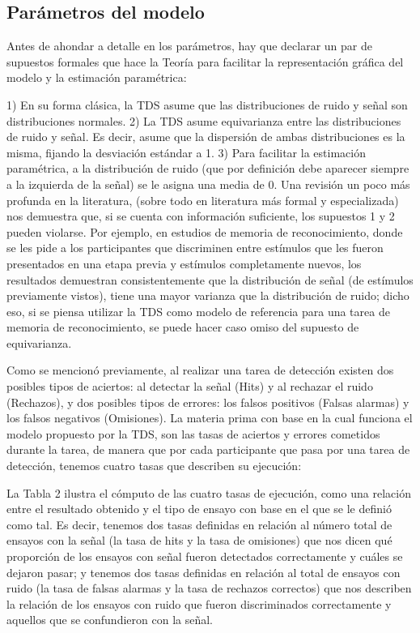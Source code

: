 \subsection{Parámetros del modelo}

Antes de ahondar a detalle en los parámetros, hay que declarar un par de supuestos formales que hace la Teoría para facilitar la representación gráfica del modelo y la estimación paramétrica:

1)	En su forma clásica, la TDS asume que las distribuciones de ruido y señal son distribuciones normales.
2)	La TDS asume equivarianza entre las distribuciones de ruido y señal. Es decir, asume que la dispersión de ambas distribuciones es la misma, fijando la desviación estándar a 1.
3)	Para facilitar la estimación paramétrica, a la distribución de ruido (que por definición debe aparecer siempre a la izquierda de la señal) se le asigna una media de 0.
Una revisión un poco más profunda en la literatura, (sobre todo en literatura más formal y especializada) nos demuestra que, si se cuenta con información suficiente, los supuestos 1 y 2 pueden violarse. Por ejemplo, en estudios de memoria de reconocimiento, donde se les pide a los participantes que discriminen entre estímulos que les fueron presentados en una etapa previa y estímulos completamente nuevos,  los resultados demuestran consistentemente que la distribución de señal (de estímulos previamente vistos), tiene una mayor varianza que la distribución de ruido; dicho eso, si se piensa utilizar la TDS como modelo de referencia para una tarea de memoria de reconocimiento, se puede hacer caso omiso del supuesto de equivarianza.  


Como se mencionó previamente, al realizar una tarea de detección existen dos posibles tipos de aciertos: al detectar la señal (Hits) y al rechazar el ruido (Rechazos), y dos posibles tipos de errores: los falsos positivos (Falsas alarmas) y los falsos negativos (Omisiones). La materia prima con base en la cual funciona el modelo propuesto por la TDS, son las tasas de aciertos y errores cometidos durante la tarea, de manera que por cada participante que pasa por una tarea de detección, tenemos cuatro tasas que describen su ejecución:

La Tabla 2 ilustra el cómputo de las cuatro tasas de ejecución, como una relación entre el resultado obtenido y el tipo de ensayo con base en el que se le definió como tal. Es decir, tenemos dos tasas definidas en relación al número total de ensayos con la señal (la tasa de hits y la tasa de omisiones) que nos dicen qué proporción de los ensayos con señal fueron detectados correctamente y cuáles se dejaron pasar; y tenemos dos tasas definidas en relación al total de ensayos con ruido (la tasa de falsas alarmas y la tasa de rechazos correctos) que nos describen la relación de los ensayos con ruido que fueron discriminados correctamente y aquellos que se confundieron con la señal.


